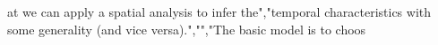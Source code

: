 {{{{{{{{{{at we can apply a spatial analysis to infer the","temporal characteristics with some generality (and vice versa).","","The basic model is to choos}}}}}}}}}}
